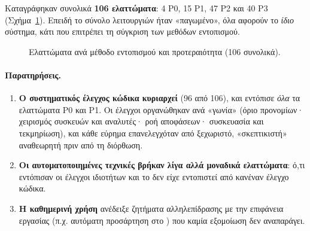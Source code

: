 Καταγράφηκαν συνολικά \textbf{106 ελαττώματα}: 4 P0, 15 P1, 47 P2 και 40 P3
(Σχήμα~\ref{fig:qa}). Επειδή το σύνολο λειτουργιών ήταν «παγωμένο», όλα αφορούν
το \emph{ίδιο} σύστημα, κάτι που επιτρέπει τη σύγκριση των μεθόδων εντοπισμού.

\begin{figure}[htbp]
\centering
{}
\caption{Ελαττώματα ανά μέθοδο εντοπισμού και προτεραιότητα (106 συνολικά).}
\label{fig:qa}
\end{figure}

\paragraph{Παρατηρήσεις.}
\begin{enumerate}
  \item \textbf{Ο συστηματικός έλεγχος κώδικα κυριαρχεί} (96 από 106), και
        εντόπισε \emph{όλα} τα ελαττώματα P0 και P1. Οι έλεγχοι οργανώθηκαν
        ανά «γωνία» (όριο προνομίων· χειρισμός συσκευών και αναλυτές· ροή
        αποφάσεων· συσκευασία και τεκμηρίωση), και κάθε εύρημα επανελεγχόταν
        από ξεχωριστό, «σκεπτικιστή» αναθεωρητή πριν από τη διόρθωση.
  \item \textbf{Οι αυτοματοποιημένες τεχνικές βρήκαν λίγα αλλά μοναδικά
        ελαττώματα}: ό,τι εντόπισαν οι έλεγχοι ιδιοτήτων και το  δεν
        είχε εντοπιστεί από κανέναν έλεγχο κώδικα.
  \item \textbf{Η καθημερινή χρήση} ανέδειξε ζητήματα αλληλεπίδρασης με την
        επιφάνεια εργασίας (π.χ. αυτόματη προσάρτηση στο ) που
        καμία εξομοίωση δεν αναπαράγει.
\end{enumerate}

